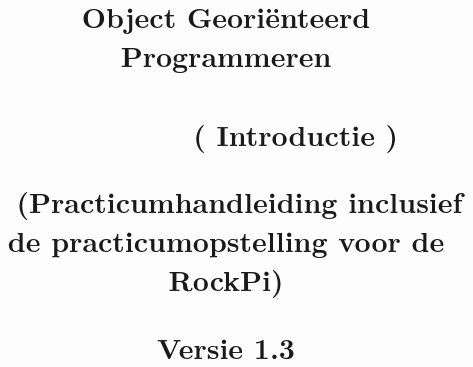 \documentclass[12pt,openright,twoside]{report}
\date{}
\title{
	
	{\vspace{-4cm}}
	
	{\hspace{-20pt}\begin{bfseries}\LARGE{\color{black}Object Georiënteerd Programmeren  \\ ~ \\ ~~~~~~~~ ( Introductie )} \end{bfseries}  } 
	\newline ~ \newline
	\small{(Practicumhandleiding inclusief de practicumopstelling voor de RockPi)}
	\ThisCenterWallPaper{0.8}{figuren/frontRock.png}
	
	{Versie 1.3}
	
	{\vspace{12cm}}	
	{\color{white}  
		\raggedleft  \par}
	
}
\begin{document}
	
	
	\maketitle
	
	\tableofcontents
	
	\let\cleardoublepage\clearpage
	
	
	
	
	
	
	
	
	\begin{comment}
	\maketitle
	
	
	\tableofcontents
	
	\let\cleardoublepage\clearpage
	\let\cleardoublepage\clearpage
	
	
%	
	\let\cleardoublepage\relax
%	

	
	
	
	
	
	\end{comment}
\end{document}

